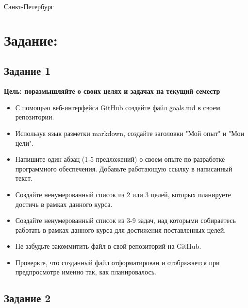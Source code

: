 \documentclass[12pt]{article}
\begin{document}
		
		
		
		\vspace{\baselineskip}
		\vspace{\baselineskip}
		\vspace{\baselineskip}
		\vspace{\baselineskip}
		\vspace{\baselineskip}
		\begin{Center}
			Санкт-Петербург \the\year{}
		\end{Center}\par
		
		\tableofcontents
		
		\newpage
		\section{Задание:}
		
		
		\subsection{Задание 1}
		
		\textbf{Цель: поразмышляйте о своих целях и задачах на текущий семестр}
		\begin{itemize}
			\item С помощью веб-интерфейса GitHub создайте файл goals.md в своем репозитории.
			\item Используя язык разметки markdown, создайте заголовки "Мой опыт" и "Мои цели".
			\item Напишите один абзац (1-5 предложений) о своем опыте по разработке программного обеспечения. Добавьте работающую ссылку в написанный текст.
			\item Создайте ненумерованный список из 2 или 3 целей, которых планируете достичь в рамках данного курса.
			\item Создайте ненумерованный список из 3-9 задач, над которыми собираетесь работать в рамках данного курса для достижения поставленных целей.
			\item Не забудьте закоммитить файл в свой репозиторий на GitHub.
			\item Проверьте, что созданный файл отформатирован и отображается при предпросмотре именно так, как планировалось.
		\end{itemize}
		
		
		\subsection{Задание 2}
		
\end{document}
